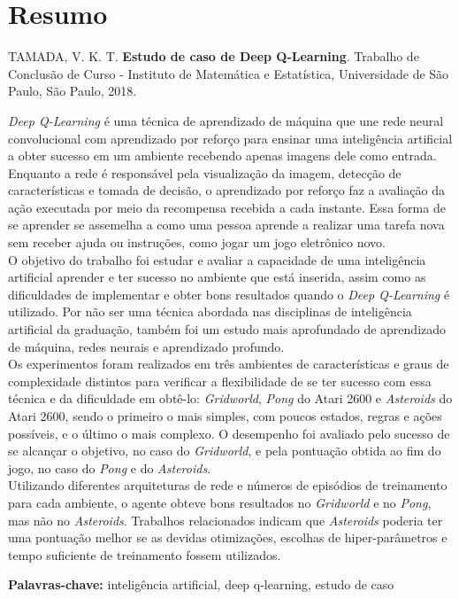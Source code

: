 \chapter*{Resumo}
%
\noindent%
TAMADA, V. K. T. \textbf{Estudo de caso de Deep Q-Learning}. Trabalho de Conclusão de Curso
 - Instituto de Matemática e Estatística, Universidade de São Paulo,
São Paulo, 2018.
\bigskip

\textit{Deep Q-Learning} é uma técnica de aprendizado de máquina que une rede neural convolucional com aprendizado por reforço para ensinar uma inteligência artificial a obter sucesso em um ambiente recebendo apenas imagens dele como entrada.
Enquanto a rede é responsável pela visualização da imagem, detecção de características e tomada de decisão, o aprendizado por reforço faz a avaliação da ação executada por meio da recompensa recebida a cada instante.
Essa forma de se aprender se assemelha a como uma pessoa aprende a realizar uma tarefa nova sem receber ajuda ou instruções, como jogar um jogo eletrônico novo.\\

O objetivo do trabalho foi estudar e avaliar a capacidade de uma inteligência artificial aprender e ter sucesso no ambiente que está inserida, assim como as dificuldades de implementar e obter bons resultados quando o \textit{Deep Q-Learning} é utilizado.
Por não ser uma técnica abordada nas disciplinas de inteligência artificial da graduação, também foi um estudo mais aprofundado de aprendizado de máquina, redes neurais e aprendizado profundo.\\

Os experimentos foram realizados em três ambientes de características e graus de complexidade distintos para verificar a flexibilidade de se ter sucesso com essa técnica e da dificuldade em obtê-lo: \textit{Gridworld}, \textit{Pong} do Atari 2600 e \textit{Asteroids} do Atari 2600, sendo o primeiro o mais simples, com poucos estados, regras e ações possíveis, e o último o mais complexo.
O desempenho foi avaliado pelo sucesso de se alcançar o objetivo, no caso do \textit{Gridworld}, e pela pontuação obtida ao fim do jogo, no caso do \textit{Pong} e do \textit{Asteroids}.\\

Utilizando diferentes arquiteturas de rede e números de episódios de treinamento para cada ambiente, o agente obteve bons resultados no \textit{Gridworld} e no \textit{Pong}, mas não no \textit{Asteroids}.
Trabalhos relacionados indicam que \textit{Asteroids} poderia ter uma pontuação melhor se as devidas otimizações, escolhas de hiper-parâmetros e tempo suficiente de treinamento fossem utilizados.
\bigskip

\noindent
\textbf{Palavras-chave:} inteligência artificial, deep q-learning, estudo de caso

